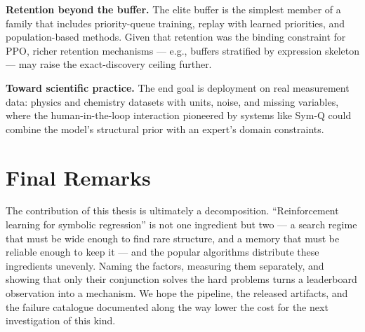\textbf{Retention beyond the buffer.} The elite buffer is the simplest member of a family that includes priority-queue training, replay with learned priorities, and population-based methods. Given that retention was the binding constraint for PPO, richer retention mechanisms --- e.g., buffers stratified by expression skeleton --- may raise the exact-discovery ceiling further.

\textbf{Toward scientific practice.} The end goal is deployment on real measurement data: physics and chemistry datasets with units, noise, and missing variables, where the human-in-the-loop interaction pioneered by systems like Sym-Q \cite{tian_interactive_2025} could combine the model's structural prior with an expert's domain constraints.

\section{Final Remarks}

The contribution of this thesis is ultimately a decomposition. ``Reinforcement learning for symbolic regression'' is not one ingredient but two --- a search regime that must be wide enough to find rare structure, and a memory that must be reliable enough to keep it --- and the popular algorithms distribute these ingredients unevenly. Naming the factors, measuring them separately, and showing that only their conjunction solves the hard problems turns a leaderboard observation into a mechanism. We hope the pipeline, the released artifacts, and the failure catalogue documented along the way lower the cost for the next investigation of this kind.
